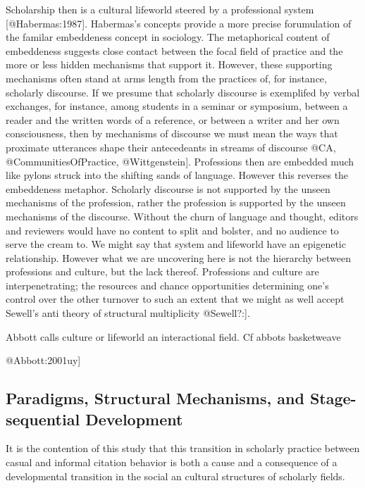 \documentclass[]{article}
\begin{document}
Scholarship then is a cultural lifeworld steered by a professional
system {[}@Habermas:1987{]}. Habermas's concepts provide a more precise
forumulation of the familar embeddeness concept in sociology. The
metaphorical content of embeddeness suggests close contact between the
focal field of practice and the more or less hidden mechanisms that
support it. However, these supporting mechanisms often stand at arms
length from the practices of, for instance, scholarly discourse. If we
presume that scholarly discourse is exemplifed by verbal exchanges, for
instance, among students in a seminar or symposium, between a reader and
the written words of a reference, or between a writer and her own
consciousness, then by mechanisms of discourse we must mean the ways
that proximate utterances shape their antecedeants in streams of
discourse @CA, @CommunitiesOfPractice, @Wittgenstein{]}. Professions
then are embedded much like pylons struck into the shifting sands of
language. However this reverses the embeddeness metaphor. Scholarly
discourse is not supported by the unseen mechanisms of the profession,
rather the profession is supported by the unseen mechanisms of the
discourse. Without the churn of language and thought, editors and
reviewers would have no content to split and bolster, and no audience to
serve the cream to. We might say that system and lifeworld have an
epigenetic relationship. However what we are uncovering here is not the
hierarchy between professions and culture, but the lack thereof.
Professions and culture are interpenetrating; the resources and chance
opportunities determining one's control over the other turnover to such
an extent that we might as well accept Sewell's anti theory of
structural multiplicity @Sewell?:{]}.

Abbott calls culture or lifeworld an interactional field. Cf abbots
basketweave

@Abbott:2001uy{]}

\subsection{Paradigms, Structural Mechanisms, and Stage-sequential
Development}\label{paradigms-structural-mechanisms-and-stage-sequential-development}

It is the contention of this study that this transition in scholarly
practice between casual and informal citation behavior is both a cause
and a consequence of a developmental transition in the social an
cultural structures of scholarly fields.
\end{document}
